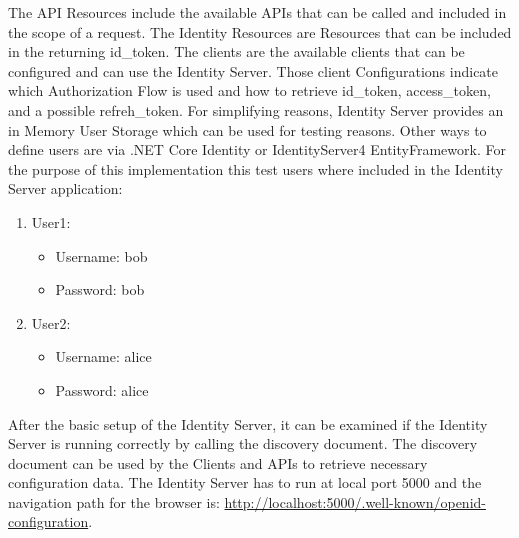 The API Resources include the available APIs that can be called and included in the scope of a request. The Identity Resources are Resources that can be included in the returning id\_token. The clients are the available clients that can be configured and can use the Identity Server. Those client Configurations indicate which Authorization Flow is used and how to retrieve id\_token, access\_token, and a possible refreh\_token. For simplifying reasons, Identity Server provides an in Memory User Storage which can be used for testing reasons. Other ways to define users are via .NET Core Identity or IdentityServer4 EntityFramework. For the purpose of this implementation this test users where included in the Identity Server application:
\begin{enumerate}
	\item User1:
	\begin{itemize}
		\item  Username: bob
		\item  Password: bob
	\end{itemize} 
	\item User2:
	\begin{itemize}
		\item  Username: alice
		\item  Password: alice
	\end{itemize} 
\end{enumerate}

After the basic setup of the Identity Server, it can be examined if the Identity Server is running correctly by calling the discovery document. The discovery document can be used by the Clients and APIs to retrieve necessary configuration data. The Identity Server has to run at local port 5000 and the navigation path for the browser is:
\url{http://localhost:5000/.well-known/openid-configuration}.

